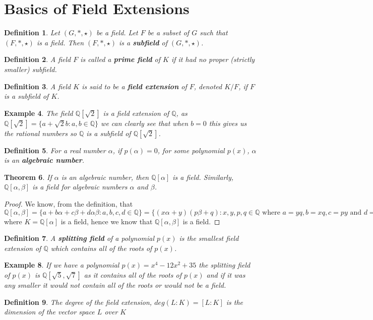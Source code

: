 \documentclass[12pt]{article}
\newtheorem{theorem}{Theorem}
\newtheorem{definition}[theorem]{Definition}
\newtheorem{example}[theorem]{Example}
\begin{document}
\section{Basics of Field Extensions}
\begin{definition}
Let \((G, *,\star )\) be a field. Let \(F\) be a subset of \(G\) such that \((F,*,\star)\) is a field. Then \((F, *,\star)\) is a \textbf{subfield}
 of \((G, *, \star)\).
\end{definition}
\begin{definition}
A field \(F\) is called a \textbf{prime field} of \(K\) if it had no proper (strictly smaller) subfield.
\end{definition}
\begin{definition}
A field \(K\) is said to be a \textbf{field extension} of \(F\), denoted \(K / F\), if \(F\) is a subfield of \(K\). \cite{Moy}
\end{definition}
\begin{example}
The field \(\mathbb{Q}[\sqrt{2}]\) is a field extension of \(\mathbb{Q}\), as \(\mathbb{Q}[\sqrt{2}] = \{a + \sqrt{2}b : a,b \in \mathbb{Q}\}\) we can clearly see that when \(b = 0\) this gives us the rational numbers so \(\mathbb{Q}\) is a subfield of \(\mathbb{Q}[\sqrt{2}]\).
\end{example}
\begin{definition}
For a real number \(\alpha\), if \(p(\alpha)=0\), for some polynomial \(p(x)\), \(\alpha\) is an \textbf{\textit{algebraic number}}.
\end{definition}
\begin{theorem}
If \(\alpha\) is an algebraic number, then \(\mathbb{Q}[\alpha]\) is a field. Similarly, \(\mathbb{Q}[\alpha,\beta]\) is a field for algebraic numbers \(\alpha\) and \(\beta\).
\end{theorem}
\begin{proof}
We know, from the definition, that \(\mathbb{Q}[\alpha,\beta] = \{a + b\alpha + c\beta + d\alpha\beta : a,b,c,d \in \mathbb{Q}\} = \{(x\alpha + y)(p\beta + q) : x,y,p,q \in \mathbb{Q} \text{ where } a = yq, b = xq, c = py \text{ and } d = xp \} = \mathbb{Q}[\alpha,\beta] = K[\beta]\) where \(K = \mathbb{Q}[\alpha]\) is a field, hence we know that \(\mathbb{Q}[\alpha,\beta]\) is a field.  
\end{proof}
\begin{definition}
A \textbf{\textit{splitting field}} of a polynomial \(p(x)\) is the smallest field extension of \(\mathbb{Q}\) which contains all of the roots of \(p(x)\).
\end{definition}
\begin{example}
If we have a polynomial \(p(x) = x^4 - 12x^2 + 35\) the splitting field of \(p(x)\) is \(\mathbb{Q}[\sqrt{5},\sqrt{7}]\) as it contains all of the roots of \(p(x)\) and if it was any smaller it would not contain all of the roots or would not be a field.
\end{example}
\begin{definition}
    The degree of the field extension, $deg(L:K)=[L:K]$ is the dimension of the vector space $L$ over $K$
\end{definition}
\end{document}
